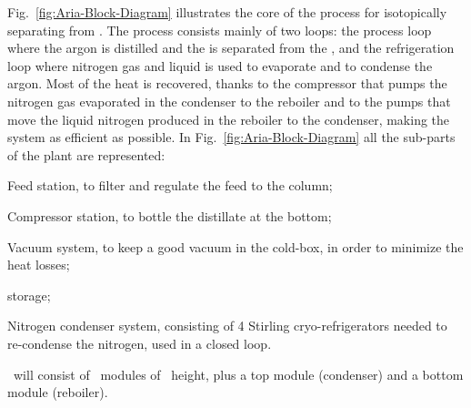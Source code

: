 Fig.~\ref{fig:Aria-Block-Diagram} illustrates the core of the process for isotopically separating  from . The process consists mainly of two loops: the process loop where the argon is distilled and the  is separated from the , and the refrigeration loop where nitrogen gas and liquid is used to evaporate and to condense the argon. Most of the heat is recovered, thanks to the compressor that pumps the nitrogen gas evaporated in the condenser to the reboiler and to the pumps that move the liquid nitrogen produced in the reboiler to the condenser, making the system as efficient as possible.  In Fig.~\ref{fig:Aria-Block-Diagram} all the sub-parts of the plant are represented:
\begin{compactitem}
\item Feed station, to filter and regulate the feed to the column;
\item Compressor station, to bottle the distillate at the bottom;
\item Vacuum system, to keep a good vacuum in the cold-box, in order to minimize the heat losses;
\item {} storage;
\item Nitrogen condenser system, consisting of 4 Stirling cryo-refrigerators needed to re-condense the nitrogen, used in a closed loop.
\end{compactitem}

\SeruciOne\ will consist of \AriaCentralModulesNumber\ modules of \AriaCentralModulesHeight\ height, plus a top module (condenser) and a bottom module (reboiler). 

